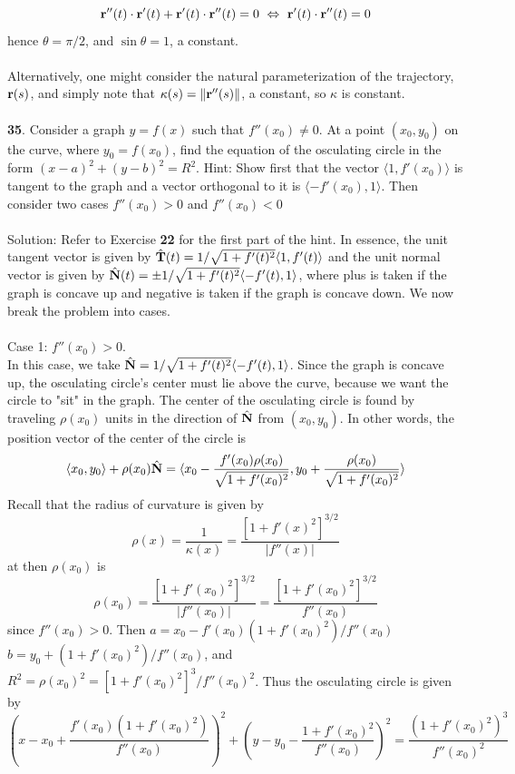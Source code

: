 \documentclass[12pt]{amsbook}
\newcommand{\la}{\langle}
\newcommand{\ra}{\rangle}
\begin{document}
$${\bf r}''(t)\cdot {\bf r}'(t)+{\bf r}'(t)\cdot{\bf r}''(t)=0 \ \Leftrightarrow \ {\bf r}'(t)\cdot{\bf r}''(t)=0$$
hence $\theta=\pi/2$, and $\sin\theta=1$, a constant.
\\
\\
Alternatively, one might consider the natural parameterization of the trajectory, ${\bf r}(s)$, and simply note that $\kappa(s)=\|{\bf r}''(s)\|$, a constant, so $\kappa$ is constant.
\\
\\
{\small\bf 35}. Consider a graph $y = f(x)$ such that $f''(x_0)\neq 0$. At a point $(x_0, y_0)$ on
the curve, where $y_0 = f(x_0)$, find the equation of the osculating circle in the
form $(x-a)^2+(y-b)^2=R^2$. Hint: Show first that the vector $\la 1,f'(x_0) \ra$ is tangent to the graph and a vector orthogonal to it is $\la -f'(x_0),1 \ra$. Then
consider two cases $f''(x_0)>0$ and $f''(x_0)<0$
\\
\\
{\sc Solution}: Refer to Exercise {\bf 22} for the first part of the hint. In essence, the unit tangent vector is given by $\hat{\bf T}(t)=1/\sqrt{1+f'(t)^2}\la 1,f'(t) \ra$ and the unit normal vector is given by $\hat{\bf N}(t)=\pm 1/\sqrt{1+f'(t)^2}\la -f'(t), 1 \ra$, where plus is taken if the graph is concave up and negative is taken if the graph is concave down. We now break the problem into cases.
\\
\\
Case 1: $f''(x_0)>0$.
\\
In this case, we take $\hat{\bf N}=1/\sqrt{1+f'(t)^2}\la -f'(t), 1 \ra$. Since the graph is concave up, the osculating circle's center must lie above the curve, because we want the circle to "sit" in the graph. The center of the osculating circle is found by traveling $\rho(x_0)$ units in the direction of $\hat{\bf N}$ from $(x_0,y_0)$. In other words, the position vector of the center of the circle is
$$\la x_0,y_0 \ra + \rho(x_0)\hat{\bf N}=\la x_0 -\frac{f'(x_0)\rho(x_0)}{\sqrt{1+f'(x_0)^2}}, y_0+\frac{\rho(x_0)}{\sqrt{1+f'(x_0)^2}} \ra$$
Recall that the radius of curvature is given by
$$\rho(x)=\frac{1}{\kappa(x)}=\frac{[1+f'(x)^2]^{3/2}}{|f''(x)|}$$
at then $\rho(x_0)$ is
$$\rho(x_0)=\frac{[1+f'(x_0)^2]^{3/2}}{|f''(x_0)|}=\frac{[1+f'(x_0)^2]^{3/2}}{f''(x_0)}$$
since $f''(x_0)>0$.
Then $a=x_0-f'(x_0)(1+f'(x_0)^2)/f''(x_0)$  $b=y_0+(1+f'(x_0)^2)/f''(x_0)$, and $R^2=\rho(x_0)^2=[1+f'(x_0)^2]^3/f''(x_0)^2$. Thus the osculating circle is given by
$$(x-x_0+\frac{f'(x_0)(1+f'(x_0)^2)}{f''(x_0)})^2+(y-y_0-\frac{1+f'(x_0)^2}{f''(x_0)})^2=\frac{(1+f'(x_0)^2)^3}{f''(x_0)^2}$$
\end{document}
